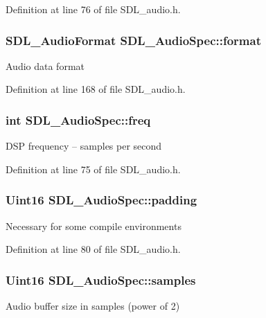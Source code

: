 Definition at line 76 of file S\+D\+L\+\_\+audio.\+h.

\hypertarget{structSDL__AudioSpec_ae37c634cac5807762f184c8d5d49fc2d}{
\subsubsection[{format}]{\setlength{\rightskip}{0pt plus 5cm}S\+D\+L\+\_\+\+Audio\+Format S\+D\+L\+\_\+\+Audio\+Spec\+::format}}\label{structSDL__AudioSpec_ae37c634cac5807762f184c8d5d49fc2d}
Audio data format 

Definition at line 168 of file S\+D\+L\+\_\+audio.\+h.

\hypertarget{structSDL__AudioSpec_a8b823ce46fc2e448cf7e6fc141aff6b2}{
\subsubsection[{freq}]{\setlength{\rightskip}{0pt plus 5cm}int S\+D\+L\+\_\+\+Audio\+Spec\+::freq}}\label{structSDL__AudioSpec_a8b823ce46fc2e448cf7e6fc141aff6b2}
D\+S\+P frequency -- samples per second 

Definition at line 75 of file S\+D\+L\+\_\+audio.\+h.

\hypertarget{structSDL__AudioSpec_a738371fc13b54cefef4db16994abeeb6}{
\subsubsection[{padding}]{\setlength{\rightskip}{0pt plus 5cm}Uint16 S\+D\+L\+\_\+\+Audio\+Spec\+::padding}}\label{structSDL__AudioSpec_a738371fc13b54cefef4db16994abeeb6}
Necessary for some compile environments 

Definition at line 80 of file S\+D\+L\+\_\+audio.\+h.

\hypertarget{structSDL__AudioSpec_a2cdf5e885808c10bfa2810b706e69f95}{
\subsubsection[{samples}]{\setlength{\rightskip}{0pt plus 5cm}Uint16 S\+D\+L\+\_\+\+Audio\+Spec\+::samples}}\label{structSDL__AudioSpec_a2cdf5e885808c10bfa2810b706e69f95}
Audio buffer size in samples (power of 2) 

